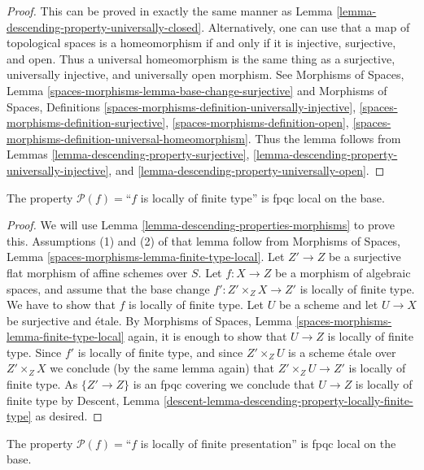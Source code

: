 \begin{proof}
This can be proved in exactly the same manner as
Lemma \ref{lemma-descending-property-universally-closed}.
Alternatively, one can use that a map of topological spaces is a
homeomorphism if and only if it is injective, surjective, and open.
Thus a universal homeomorphism is the same thing as a
surjective, universally injective, and universally open morphism.
See Morphisms of Spaces, Lemma
\ref{spaces-morphisms-lemma-base-change-surjective} and
Morphisms of Spaces, Definitions
\ref{spaces-morphisms-definition-universally-injective},
\ref{spaces-morphisms-definition-surjective},
\ref{spaces-morphisms-definition-open},
\ref{spaces-morphisms-definition-universal-homeomorphism}.
Thus the lemma follows from
Lemmas \ref{lemma-descending-property-surjective},
\ref{lemma-descending-property-universally-injective}, and
\ref{lemma-descending-property-universally-open}.
\end{proof}

\begin{lemma}
\label{lemma-descending-property-locally-finite-type}
The property $\mathcal{P}(f) =$``$f$ is locally of finite type''
is fpqc local on the base.
\end{lemma}

\begin{proof}
We will use
Lemma \ref{lemma-descending-properties-morphisms}
to prove this. Assumptions (1) and (2) of that lemma follow from
Morphisms of Spaces,
Lemma \ref{spaces-morphisms-lemma-finite-type-local}.
Let $Z' \to Z$ be a surjective flat morphism of affine schemes over $S$.
Let $f : X \to Z$ be a morphism of algebraic spaces, and assume
that the base change $f' : Z' \times_Z X \to Z'$ is locally of finite type.
We have to show that $f$ is locally of finite type. Let $U$ be a scheme
and let $U \to X$ be surjective and \'etale. By
Morphisms of Spaces,
Lemma \ref{spaces-morphisms-lemma-finite-type-local}
again, it is enough to show that $U \to Z$ is locally of finite type.
Since $f'$ is locally of finite type, and since $Z' \times_Z U$ is a
scheme \'etale over $Z' \times_Z X$ we conclude (by the same lemma again) that
$Z' \times_Z U \to Z'$ is locally of finite type.
As $\{Z' \to Z\}$ is an fpqc covering we conclude that
$U \to Z$ is locally of finite type by
Descent, Lemma \ref{descent-lemma-descending-property-locally-finite-type}
as desired.
\end{proof}

\begin{lemma}
\label{lemma-descending-property-locally-finite-presentation}
The property $\mathcal{P}(f) =$``$f$ is locally of finite presentation''
is fpqc local on the base.
\end{lemma}

